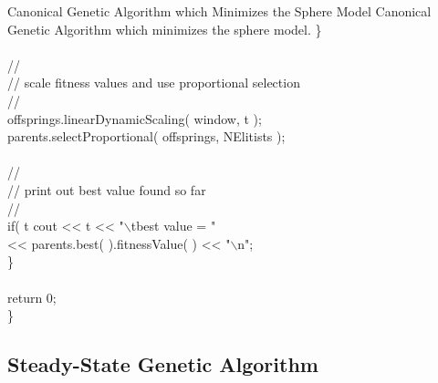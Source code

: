\begin{programlisting}{Canonical Genetic Algorithm which Minimizes the Sphere Model}{
    Canonical Genetic Algorithm which minimizes the sphere model.}
        \}\\
\\
        //\\
        // scale fitness values and use proportional selection\\
        //\\
        offsprings.linearDynamicScaling( window, t );\\
        parents.selectProportional( offsprings, NElitists );\\
\\
        //\\
        // print out best value found so far\\
        //\\
        if( t %
            cout << t << "$\backslash$tbest value = "\\
                 << parents.best( ).fitnessValue( ) << "$\backslash$n";\\
    \}\\
\\
    return 0;\\
\}\\
\end{programlisting}

\clearpage
\subsection{Steady-State Genetic Algorithm}

